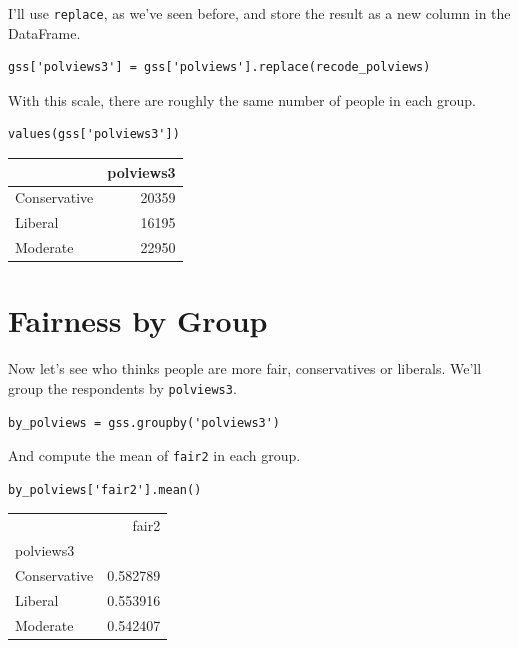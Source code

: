 I'll use \passthrough{\lstinline!replace!}, as we've seen before, and
store the result as a new column in the DataFrame.

\begin{lstlisting}[]
gss['polviews3'] = gss['polviews'].replace(recode_polviews)
\end{lstlisting}

With this scale, there are roughly the same number of people in each
group.

\begin{lstlisting}[]
values(gss['polviews3'])
\end{lstlisting}

\begin{tabular}{lr}
\midrule
{} &  polviews3 \\
\midrule
Conservative &      20359 \\
Liberal      &      16195 \\
Moderate     &      22950 \\
\midrule
\end{tabular}

\hypertarget{fairness-by-group}{%
\section{Fairness by Group}\label{fairness-by-group}}

Now let's see who thinks people are more fair, conservatives or
liberals. We'll group the respondents by
\passthrough{\lstinline!polviews3!}.

\begin{lstlisting}[]
by_polviews = gss.groupby('polviews3')
\end{lstlisting}

And compute the mean of \passthrough{\lstinline!fair2!} in each group.

\begin{lstlisting}[]
by_polviews['fair2'].mean()
\end{lstlisting}

\begin{tabular}{lr}
\midrule
{} &     fair2 \\
polviews3    &           \\
\midrule
Conservative &  0.582789 \\
Liberal      &  0.553916 \\
Moderate     &  0.542407 \\
\midrule
\end{tabular}

